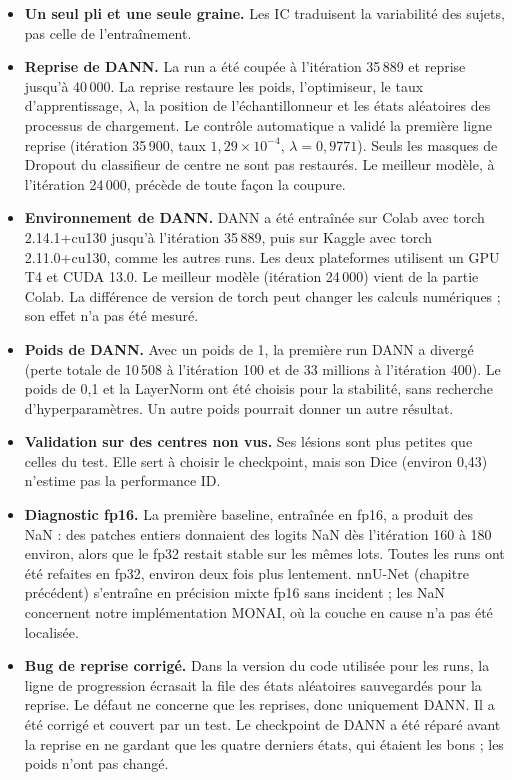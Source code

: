 \begin{itemize}
  \item \textbf{Un seul pli et une seule graine.} Les IC traduisent la variabilité des sujets, pas celle de l'entraînement.
  \item \textbf{Reprise de DANN.} La run a été coupée à l'itération 35\,889 et reprise jusqu'à 40\,000. La reprise restaure les poids, l'optimiseur, le taux d'apprentissage, $\lambda$, la position de l'échantillonneur et les états aléatoires des processus de chargement. Le contrôle automatique a validé la première ligne reprise (itération 35\,900, taux $1{,}29 \times 10^{-4}$, $\lambda = 0{,}9771$). Seuls les masques de Dropout du classifieur de centre ne sont pas restaurés. Le meilleur modèle, à l'itération 24\,000, précède de toute façon la coupure.
  \item \textbf{Environnement de DANN.} DANN a été entraînée sur Colab avec torch 2.14.1+cu130 jusqu'à l'itération 35\,889, puis sur Kaggle avec torch 2.11.0+cu130, comme les autres runs. Les deux plateformes utilisent un GPU T4 et CUDA 13.0. Le meilleur modèle (itération 24\,000) vient de la partie Colab. La différence de version de torch peut changer les calculs numériques ; son effet n'a pas été mesuré.
  \item \textbf{Poids de DANN.} Avec un poids de 1, la première run DANN a divergé (perte totale de 10\,508 à l'itération 100 et de 33 millions à l'itération 400). Le poids de 0,1 et la LayerNorm ont été choisis pour la stabilité, sans recherche d'hyperparamètres. Un autre poids pourrait donner un autre résultat.
  \item \textbf{Validation sur des centres non vus.} Ses lésions sont plus petites que celles du test. Elle sert à choisir le checkpoint, mais son Dice (environ 0,43) n'estime pas la performance ID.
  \item \textbf{Diagnostic fp16.} La première baseline, entraînée en fp16, a produit des NaN : des patches entiers donnaient des logits NaN dès l'itération 160 à 180 environ, alors que le fp32 restait stable sur les mêmes lots. Toutes les runs ont été refaites en fp32, environ deux fois plus lentement. nnU-Net (chapitre précédent) s'entraîne en précision mixte fp16 sans incident ; les NaN concernent notre implémentation MONAI, où la couche en cause n'a pas été localisée.
  \item \textbf{Bug de reprise corrigé.} Dans la version du code utilisée pour les runs, la ligne de progression écrasait la file des états aléatoires sauvegardés pour la reprise. Le défaut ne concerne que les reprises, donc uniquement DANN. Il a été corrigé et couvert par un test. Le checkpoint de DANN a été réparé avant la reprise en ne gardant que les quatre derniers états, qui étaient les bons ; les poids n'ont pas changé.

\end{itemize}
